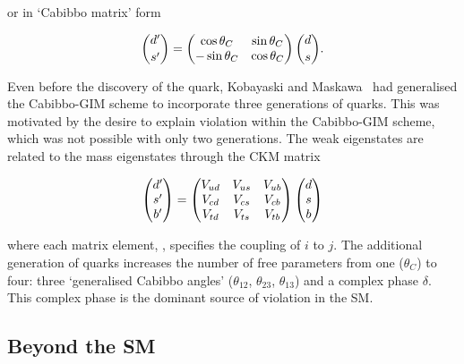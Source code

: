 \noindent or in `Cabibbo matrix' form

\begin{equation}
\binom{{d}^\prime}{{s}^\prime} = 
\begin{pmatrix}
\cos\theta_{C} & \sin\theta_{C} \\
-\sin\theta_{C} & \cos\theta_{C} \\
\end{pmatrix}
\binom{{d}}{{s}}.
\end{equation}

Even before the discovery of the \cquark quark, Kobayaski and Maskawa~\cite{kobayashi-maskawa} had generalised the Cabibbo-GIM scheme to incorporate three generations of quarks. This was motivated by the desire to explain \CP violation within the Cabibbo-GIM scheme, which was not possible with only two generations. The weak eigenstates are related to the mass eigenstates through the CKM matrix

\begin{equation}
\begin{pmatrix}
{\ensuremath{d}}^\prime \\
{s}^\prime \\
{b}^\prime \\
\end{pmatrix}
=
\begin{pmatrix}
{\ensuremath{V_{{u}{d}}}} & {V_{{u}{s}}} & {V_{{u}{b}}} \\
{V_{{c}{d}}} & {V_{{c}{s}}} & {V_{{c}{b}}} \\
{V_{{t}{d}}} & {V_{{t}{s}}} & {V_{{t}{b}}} \\
\end{pmatrix}
\begin{pmatrix}
{\ensuremath{d}} \\
{s} \\
{b} \\
\end{pmatrix}
\end{equation}

\noindent where each matrix element, \Vij, specifies the coupling of $i$ to $j$. The additional generation of quarks increases the number of free parameters from one ($\theta_{C}$) to four: three `generalised Cabibbo angles' ($\theta_{12}$, $\theta_{23}$, $\theta_{13}$) and a complex phase $\delta$. This complex phase is the dominant source of \CP violation in the SM. 

\subsection{Beyond the SM}

